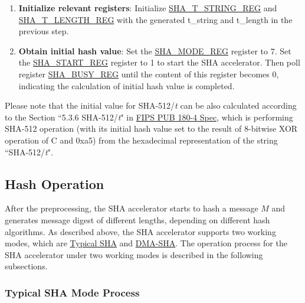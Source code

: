 \documentclass[main\_\_EN.tex]{subfiles}
\begin{document}
\begin{enumerate}
\begin{itemize}
        For example, if {\it{t}} = 231, then $t_0$ = 1, $t_1$ = 3, $t_2$ = 2, and $t\_string$ = $32'h32333180$.
        
    \end{itemize}
    \item \textbf{Initialize relevant registers}: Initialize \hyperref[regdesc:SHATSTRINGREG]{SHA\_T\_STRING\_REG} and  \hyperref[regdesc:SHATLENGTHREG]{SHA\_T\_LENGTH\_REG} with the generated t\_string and t\_length in the previous step. 
    
    \item \textbf{Obtain initial hash value}: Set the \hyperref[regdesc:SHAMODEREG]{SHA\_MODE\_REG} register to 7. Set the \hyperref[regdesc:SHASTARTREG]{SHA\_START\_REG} register to 1 to start the SHA accelerator. Then poll register \hyperref[regdesc:SHABUSYREG]{SHA\_BUSY\_REG} until the content of this register becomes 0, indicating the calculation of initial hash value is completed.
\end{enumerate}

Please note that the initial value for SHA-512/{\it{t}} can be also calculated according to the Section ``5.3.6 SHA-512/{\it{t}}" in \href{https://doi.org/10.6028/NIST.FIPS.180-4}{FIPS PUB 180-4 Spec}, which is performing SHA-512 operation (with its initial hash value set to the result of 8-bitwise XOR operation of C and 0xa5) from the hexadecimal representation of the string ``SHA-512/{\it{t}}".

\subsection{Hash Operation}\label{sec:sha-hash-operation}

After the preprocessing, the \chipname{} SHA accelerator starts to hash a message \begin{math}M\end{math} and generates message digest of different lengths, depending on different hash algorithms. As described above, the \chipname{} SHA accelerator supports two working modes, which are \hyperref[sec:sha-typical-sha]{Typical SHA} and \hyperref[sec:sha-dma-sha]{DMA-SHA}. The
operation process for the SHA accelerator under two working modes is described in the following subsections.

\subsubsection{Typical SHA Mode Process}\label{sec:sha-typical-sha}
\end{document}
